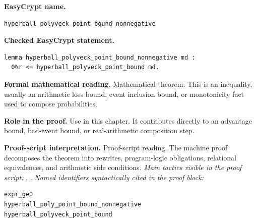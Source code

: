 \begin{formaltheorem}
\noindent\textbf{EasyCrypt name.}
\begin{lstlisting}[language=EasyCrypt,basicstyle=\ttfamily\scriptsize]
hyperball_polyveck_point_bound_nonnegative
\end{lstlisting}
\noindent\textbf{Checked EasyCrypt statement.}
\begin{lstlisting}[language=EasyCrypt,basicstyle=\ttfamily\scriptsize]
lemma hyperball_polyveck_point_bound_nonnegative md :
  0%r <= hyperball_polyveck_point_bound md.
\end{lstlisting}
\noindent\textbf{Formal mathematical reading.}
Mathematical theorem. This is an inequality, usually an arithmetic loss bound, event inclusion bound, or monotonicity fact used to compose probabilities.

\noindent\textbf{Role in the proof.}
Use in this chapter. It contributes directly to an advantage bound, bad-event bound, or real-arithmetic composition step.

\noindent\textbf{Proof-script interpretation.}
Proof-script reading. The machine proof decomposes the theorem into rewrites, program-logic obligations, relational equivalences, and arithmetic side conditions.
\emph{Main tactics visible in the proof script:} , .
\emph{Named identifiers syntactically cited in the proof block:}
\begin{lstlisting}[language=EasyCrypt,basicstyle=\ttfamily\scriptsize]
expr_ge0
hyperball_poly_point_bound_nonnegative
hyperball_polyveck_point_bound
\end{lstlisting}

\end{formaltheorem}

